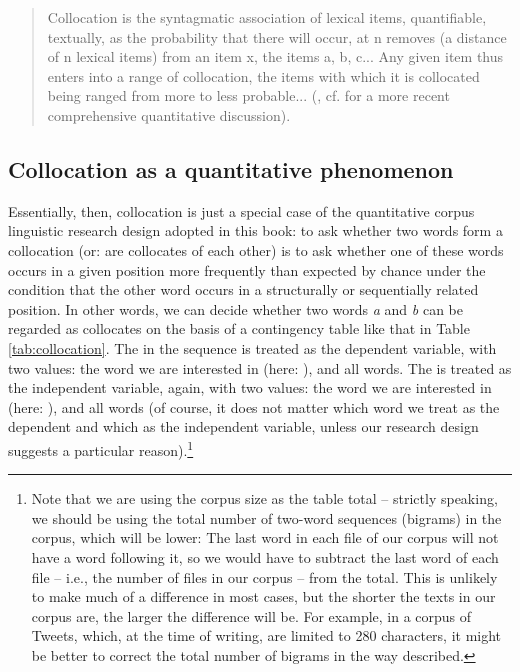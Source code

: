 \begin{quotation}
Collocation is the syntagmatic association of lexical items, quantifiable, textually, as the probability that there will occur, at n removes (a distance of n lexical items) from an item x, the items a, b, c... Any given item thus enters into a range of collocation, the items with which it is collocated being ranged from more to less probable... (\citet[276]{halliday_categories_1961}, cf. \citet{church_word_1990} for a more recent comprehensive quantitative discussion).
\end{quotation}

\subsection{Collocation as a quantitative phenomenon}
\label{sec:collocationasaquantitativephenomenon}

Essentially, then, collocation is just a special case of the quantitative corpus linguistic research design adopted in this book: to ask whether two words form a collocation (or: are collocates of each other) is to ask whether one of these words occurs in a given position more frequently than expected by chance under the condition that the other word occurs in a structurally or sequentially related position. In other words, we can decide whether two words \textit{a} and \textit{b} can be regarded as collocates on the basis of a contingency table like that in Table \ref{tab:collocation}. The  in the sequence is treated as the dependent variable, with two values: the word we are interested in (here: ), and all  words. The  is treated as the independent variable, again, with two values: the word we are interested in (here: ), and all  words (of course, it does not matter which word we treat as the dependent and which as the independent variable, unless our research design suggests a particular reason).\footnote{Note that we are using the corpus size as the table total -- strictly speaking, we should be using the total number of two-word sequences (bigrams) in the corpus, which will be lower: The last word in each file of our corpus will not have a word following it, so we would have to subtract the last word of each file -- i.e., the number of files in our corpus -- from the total. This is unlikely to make much of a difference in most cases, but the shorter the texts in our corpus are, the larger the difference will be. For example, in a corpus of Tweets, which, at the time of writing, are limited to 280 characters, it might be better to correct the total number of bigrams in the way described.}


